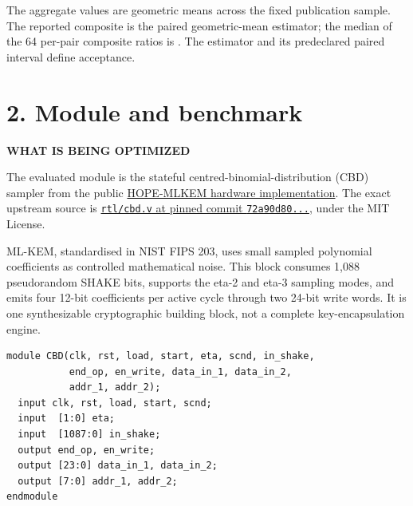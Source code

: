 \documentclass[10pt,a4paper]{article}
\newcommand{\smallcaps}[1]{\textcolor{Mid}{\fontsize{8.5}{10}\selectfont\bfseries\MakeUppercase{#1}}}
\newcommand{\newpageheading}[2]{\clearpage\section{#1}\smallcaps{#2}\vspace{6pt}}
\begin{document}
The aggregate values are geometric means across the fixed publication sample. The reported composite \CompositeScore{} is the paired geometric-mean estimator; the median of the 64 per-pair composite ratios is \CompositeMedian. The estimator and its predeclared paired interval define acceptance.

\newpageheading{2. Module and benchmark}{What is being optimized}

The evaluated module is the stateful centred-binomial-distribution (CBD) sampler from the public
\href{https://github.com/HWSec-CSIC/hope-mlkem}{HOPE-MLKEM hardware implementation}. The exact upstream source is
\href{https://github.com/HWSec-CSIC/hope-mlkem/blob/72a90d80484d45d0bed1e0f9903bd0fb78cceb47/rtl/cbd.v}{\texttt{rtl/cbd.v} at pinned commit \texttt{72a90d80...}}, under the MIT License.

ML-KEM, standardised in NIST FIPS 203, uses small sampled polynomial coefficients as controlled mathematical noise. This block consumes 1,088 pseudorandom SHAKE bits, supports the eta-2 and eta-3 sampling modes, and emits four 12-bit coefficients per active cycle through two 24-bit write words. It is one synthesizable cryptographic building block, not a complete key-encapsulation engine.

\begin{lstlisting}[language=VerilogDiff]
module CBD(clk, rst, load, start, eta, scnd, in_shake,
           end_op, en_write, data_in_1, data_in_2,
           addr_1, addr_2);
  input clk, rst, load, start, scnd;
  input  [1:0] eta;
  input  [1087:0] in_shake;
  output end_op, en_write;
  output [23:0] data_in_1, data_in_2;
  output [7:0] addr_1, addr_2;
endmodule
\end{lstlisting}

\begin{center}
\end{center}
\end{document}
